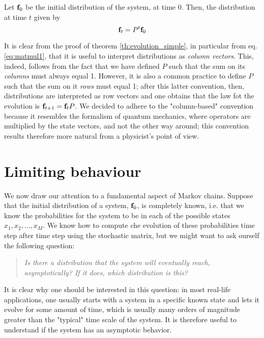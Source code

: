 \begin{corollary} \label{th:evolution_complete}
    Let $\mathbf{f}_0$ be the initial distribution of the system, at time 0. Then, the distribution at time $t$ given by
    \begin{equation}
        \mathbf{f}_t = P^t \mathbf{f}_0
    \end{equation}
\end{corollary}

\begin{remark}
    It is clear from the proof of theorem \ref{th:evolution_simple}, in particular from eq. \ref{eq:matmul1}, that it is useful to interpret distributions as \emph{column vectors}. This, indeed, follows from the fact that we have defined $P$ such that the sum on its \emph{columns} must always equal 1. However, it is also a common practice to define $P$ such that the sum on it \emph{rows} must equal 1; after this latter convention, then, distributions are interpreted as row vectors and one obtains that the law fot the evolution is $\mathbf{f}_{t+1} = \mathbf{f}_t P$. We decided to adhere to the "column-based" convention because it resembles the formalism of quantum mechanics, where operators are multiplied by the state vectors, and not the other way around; this convention results therefore more natural from a physicist's point of view.
\end{remark}

\section{Limiting behaviour}
We now draw our attention to a fundamental aspect of Markov chains. Suppose that the initial distribution of a system, $\mathbf{f}_0$, is completely known, i.e. that we know the probabilities for the system to be in each of the possible states $x_1, x_2, \dots, x_M$. We know how to compute che evolution of these probabilities time step after time step using the stochastic matrix, but we might want to ask ourself the following question: 
\begin{quote}
    \emph{Is there a distribution that the system will eventually reach, asymptotically? If it does, which distribution is this?}
\end{quote}

It is clear why one should be interested in this question: in most real-life applications, one usually starts with a system in a specific known state and lets it evolve for some amount of time, which is usually many orders of magnitude greater than the "typical" time scale of the system. It is therefore useful to understand if the system has an asymptotic behavior.

